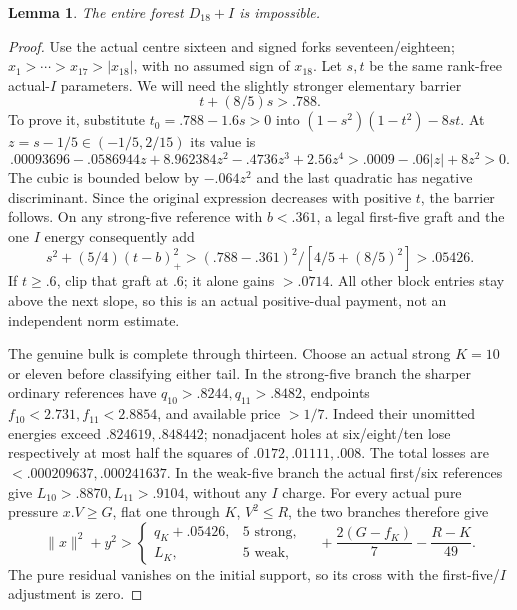 \documentclass[11pt]{article}
\newtheorem{lemma}[theorem]{Lemma}
\theoremstyle{definition}
\theoremstyle{remark}
\newcommand{\norm}[1]{\lVert #1\rVert}
\begin{document}
\begin{lemma}\label{app:tail:lem:D18I}
The entire forest $D_{18}+I$ is impossible.
\end{lemma}
\begin{proof}
Use the actual centre sixteen and signed forks seventeen/eighteen;
$x_1>\cdots>x_{17}>|x_{18}|$, with no assumed sign of $x_{18}$.
Let $s,t$ be the same rank-free actual-$I$ parameters.
We will need the slightly stronger elementary barrier
\begin{equation}\label{app:tail:eq:I788}
 t+(8/5)s>.788.
\end{equation}
To prove it, substitute $t_0=.788-1.6s>0$ into
$(1-s^2)(1-t^2)-8st$.
At $z=s-1/5\in(-1/5,2/15)$ its value is
\[
 .00093696-.0586944z+8.962384z^2-.4736z^3+2.56z^4
 >.0009-.06|z|+8z^2>0.
\]
The cubic is bounded below by $-.064z^2$ and the last
quadratic has negative discriminant. Since the original
expression decreases with positive $t$, the barrier follows.
On any strong-five reference with $b<.361$, a legal first-five
graft and the one $I$ energy consequently add
\[
 s^2+(5/4)(t-b)_+^2>
 (.788-.361)^2/[4/5+(8/5)^2]>.05426.
\]
If $t\ge.6$, clip that graft at $.6$; it alone gains $>.0714$.
All other block entries stay above the next slope, so this is
an actual positive-dual payment, not an independent norm estimate.

The genuine bulk is complete through thirteen. Choose an actual
strong $K=10$ or eleven before classifying either tail.
In the strong-five branch the sharper ordinary references have
$q_{10}>.8244,q_{11}>.8482$, endpoints
$f_{10}<2.731,f_{11}<2.8854$, and available price $>1/7$.
Indeed their unomitted energies exceed $.824619,.848442$;
nonadjacent holes at six/eight/ten lose respectively at most
half the squares of $.0172,.01111,.008$.
The total losses are $<.000209637,.000241637$.
In the weak-five branch the actual first/six references give
$L_{10}>.8870,L_{11}>.9104$, without any $I$ charge.
For every actual pure pressure $x.V\ge G$, flat one through
$K$, $V^2\le R$, the two branches therefore give
\begin{equation}\label{app:tail:eq:D18Ipurepay}
 \norm x^2+y^2>
 \begin{cases}q_K+.05426,&5\text{ strong},\\L_K,&5\text{ weak},\end{cases}
 \quad +{\frac{2(G-f_K)}{7}}-{\frac{R-K}{49}}.
\end{equation}
The pure residual vanishes on the initial support, so its
cross with the first-five/$I$ adjustment is zero.


\end{proof}
\end{document}
